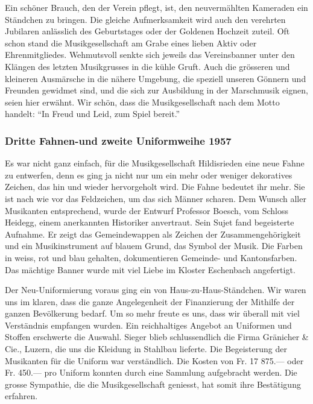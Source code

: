 \begin{history}
    Ein schöner Brauch, den der Verein pflegt, ist, den neuvermählten Kameraden
    ein Ständchen zu bringen. Die gleiche Aufmerksamkeit wird auch den verehrten
    Jubilaren anlässlich des Geburtstages oder der Goldenen Hochzeit zuteil. Oft
    schon stand die Musikgesellschaft am Grabe eines lieben Aktiv oder
    Ehrenmitgliedes. Wehmutsvoll senkte sich jeweils das Vereinsbanner unter den
    Klängen des letzten Musikgrusses in die kühle Gruft. Auch die grösseren und
    kleineren Ausmärsche in die nähere Umgebung, die speziell unseren Gönnern
    und Freunden gewidmet sind, und die sich zur Ausbildung in der Marschmusik
    eignen, seien hier erwähnt. Wir schön, dass die Musikgesellschaft nach dem
    Motto handelt: \enquote{In Freud und Leid, zum Spiel bereit.}

    \subsubsection*{Dritte Fahnen-und zweite Uniformweihe 1957}

    Es war nicht ganz einfach, für die Musikgesellschaft Hildisrieden eine neue
    Fahne zu entwerfen, denn es ging ja nicht nur um ein mehr oder weniger
    dekoratives Zeichen, das hin und wieder hervorgeholt wird. Die Fahne
    bedeutet ihr mehr. Sie ist nach wie vor das Feldzeichen, um das sich Männer
    scharen. Dem Wunsch aller Musikanten entsprechend, wurde der Entwurf
    Professor Boesch, vom Schloss Heidegg, einem anerkannten Historiker
    anvertraut. Sein Sujet fand begeisterte Aufnahme. Er zeigt das
    Gemeindewappen als Zeichen der Zusammengehörigkeit und ein Musikinstrument
    auf blauem Grund, das Symbol der Musik. Die Farben in weiss, rot und blau
    gehalten, dokumentieren Gemeinde- und Kantonsfarben. Das mächtige Banner wurde
    mit viel Liebe im Kloster Eschenbach angefertigt.

    Der Neu-Uniformierung voraus ging ein von Haus-zu-Haus-Ständchen. Wir waren
    uns im klaren, dass die ganze Angelegenheit der Finanzierung der Mithilfe
    der ganzen Bevölkerung bedarf. Um so mehr freute es uns, dass wir überall
    mit viel Verständnis empfangen wurden. Ein reichhaltiges Angebot an
    Uniformen und Stoffen erschwerte die Auswahl. Sieger blieb schlussendlich
    die Firma Gränicher \& Cie., Luzern, die uns die Kleidung in Stahlbau
    lieferte. Die Begeisterung der Musikanten für die Uniform war verständlich.
    Die Kosten von Fr. 17 875.— oder Fr. 450.— pro Uniform konnten durch eine
    Sammlung aufgebracht werden. Die grosse Sympathie, die die Musikgesellschaft
    geniesst, hat somit ihre Bestätigung erfahren.

\end{history}


